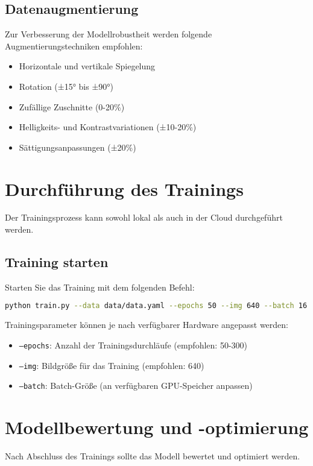 \documentclass[12pt, a4paper]{scrreprt}
\begin{document}
\subsection{Datenaugmentierung}
Zur Verbesserung der Modellrobustheit werden folgende Augmentierungstechniken empfohlen:
\begin{itemize}
    \item Horizontale und vertikale Spiegelung
    \item Rotation (±15° bis ±90°)
    \item Zufällige Zuschnitte (0-20\%)
    \item Helligkeits- und Kontrastvariationen (±10-20\%)
    \item Sättigungsanpassungen (±20\%)
\end{itemize}

\section{Durchführung des Trainings}
Der Trainingsprozess kann sowohl lokal als auch in der Cloud durchgeführt werden.

\subsection{Training starten}
Starten Sie das Training mit dem folgenden Befehl:
\begin{lstlisting}[language=bash]
python train.py --data data/data.yaml --epochs 50 --img 640 --batch 16
\end{lstlisting}

Trainingsparameter können je nach verfügbarer Hardware angepasst werden:
\begin{itemize}
    \item \texttt{--epochs}: Anzahl der Trainingsdurchläufe (empfohlen: 50-300)
    \item \texttt{--img}: Bildgröße für das Training (empfohlen: 640)
    \item \texttt{--batch}: Batch-Größe (an verfügbaren GPU-Speicher anpassen)
\end{itemize}

\section{Modellbewertung und -optimierung}
Nach Abschluss des Trainings sollte das Modell bewertet und optimiert werden.
\end{document}
